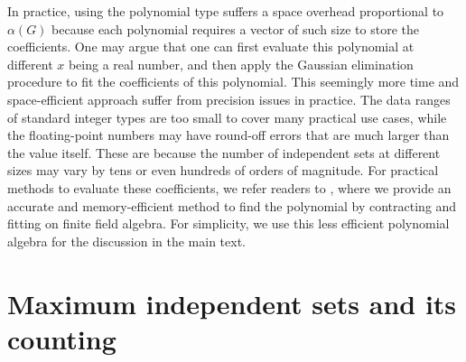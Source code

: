 \documentclass[review, onefignum, onetabnum]{siamart190516}
\begin{document}
In practice, using the polynomial type suffers a space overhead proportional to $\alpha(G)$ because each polynomial requires a vector of such size to store the coefficients. 
One may argue that one can first evaluate this polynomial at different $x$ being a real number,
and then apply the Gaussian elimination procedure to fit the coefficients of this polynomial.
This seemingly more time and space-efficient approach suffer from precision issues in practice.
The data ranges of standard integer types are too small to cover many practical use cases,
while the floating-point numbers may have round-off errors that are much larger than the value itself.
These are because the number of independent sets at different sizes may vary by tens or even hundreds of orders of magnitude.
For practical methods to evaluate these coefficients, we refer readers to , where we provide an accurate and memory-efficient method to find the polynomial by contracting and fitting on finite field algebra.
For simplicity, we use this less efficient polynomial algebra for the discussion in the main text.


\section{Maximum independent sets and its counting}\label{sec:counting}
\end{document}
